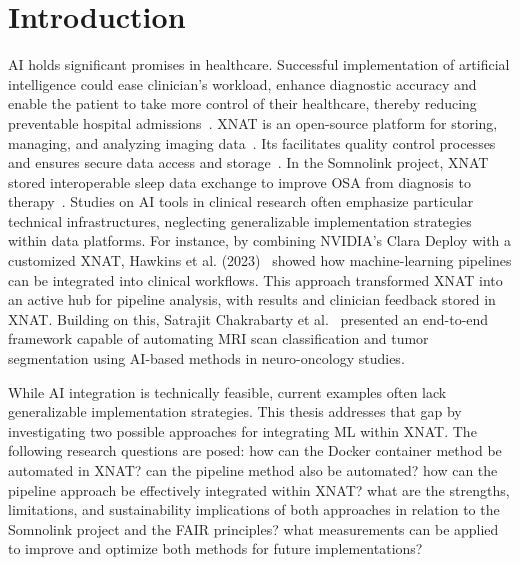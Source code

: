 

\chapter{Introduction}

\ac{AI} holds significant promises in healthcare. Successful implementation of artificial intelligence could ease clinician's workload, enhance diagnostic accuracy and enable the patient to take more control of their healthcare, thereby reducing preventable hospital admissions~\cite{aung_promise_2021}. XNAT is an open-source platform for storing, managing, and analyzing imaging data~\cite{xnat_about}. Its facilitates quality control processes and ensures secure data access and storage~\cite{marcus_extensible_2007}. In the Somnolink project, XNAT stored interoperable sleep data exchange to improve \ac{OSA} from diagnosis to therapy~\cite{krefting_somnolink_2025}.
Studies on AI tools in clinical research often emphasize particular technical infrastructures, neglecting generalizable implementation strategies within data platforms. For instance, by combining NVIDIA’s Clara Deploy with a customized XNAT, Hawkins et al. (2023)~\cite{hawkins_implementation_2023} showed how machine-learning pipelines can be integrated into clinical workflows. This approach transformed XNAT into an active hub for pipeline analysis, with results and clinician feedback stored in XNAT. Building on this, Satrajit Chakrabarty et al.~\cite{chakrabarty_deep_2023} presented an end-to-end framework capable of automating \ac{MRI} scan classification and tumor segmentation using AI-based methods in neuro-oncology studies. 

While AI integration is technically feasible, current examples often lack generalizable implementation strategies. 
This thesis addresses that gap by investigating two possible approaches for integrating \ac{ML} within XNAT. The following research questions are posed: how can the Docker container method be automated in XNAT? can the pipeline method also be automated? how can the pipeline approach be effectively integrated within XNAT? what are the strengths, limitations, and sustainability implications of both approaches in relation to the Somnolink project and the FAIR principles? what measurements can be applied to improve and optimize both methods for future implementations?






 
